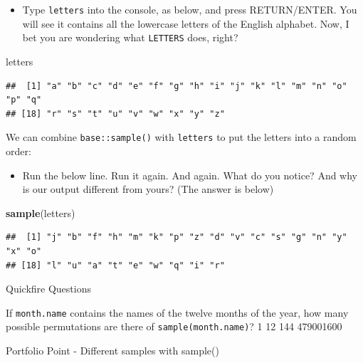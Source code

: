 \documentclass[]{book}
\newenvironment{Shaded}{\begin{snugshade}}{\end{snugshade}}
\newcommand{\KeywordTok}[1]{\textcolor[rgb]{0.13,0.29,0.53}{\textbf{#1}}}
\newcommand{\NormalTok}[1]{#1}
\providecommand{\tightlist}{%
  \setlength{\itemsep}{0pt}\setlength{\parskip}{0pt}}
\begin{document}
\begin{itemize}
\tightlist
\item
  Type \texttt{letters} into the console, as below, and press RETURN/ENTER. You will see it contains all the lowercase letters of the English alphabet. Now, I bet you are wondering what \texttt{LETTERS} does, right?
\end{itemize}

\begin{Shaded}
\begin{Highlighting}[]
\NormalTok{letters}
\end{Highlighting}
\end{Shaded}

\begin{verbatim}
##  [1] "a" "b" "c" "d" "e" "f" "g" "h" "i" "j" "k" "l" "m" "n" "o" "p" "q"
## [18] "r" "s" "t" "u" "v" "w" "x" "y" "z"
\end{verbatim}

We can combine \texttt{base::sample()} with \texttt{letters} to put the letters into a random order:

\begin{itemize}
\tightlist
\item
  Run the below line. Run it again. And again. What do you notice? And why is our output different from yours? (The answer is below)
\end{itemize}

\begin{Shaded}
\begin{Highlighting}[]
\KeywordTok{sample}\NormalTok{(letters)}
\end{Highlighting}
\end{Shaded}

\begin{verbatim}
##  [1] "j" "b" "f" "h" "m" "k" "p" "z" "d" "v" "c" "s" "g" "n" "y" "x" "o"
## [18] "l" "u" "a" "t" "e" "w" "q" "i" "r"
\end{verbatim}

{Quickfire Questions}

If \texttt{month.name} contains the names of the twelve months of the year, how many possible permutations are there of \texttt{sample(month.name)}? 1 12 144 479001600

Portfolio Point - Different samples with sample()
\end{document}
